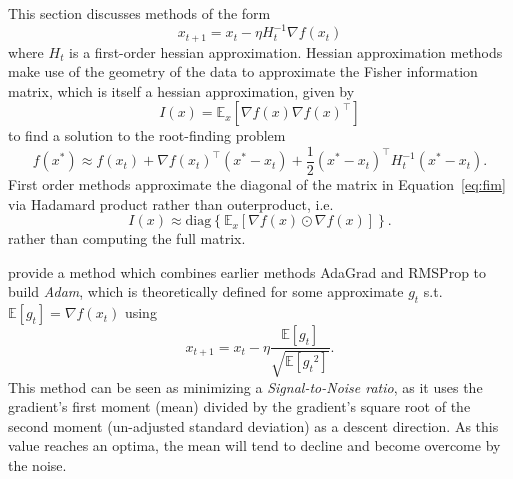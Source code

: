 \documentclass{article}
\newcommand{\E}{\mathbb E}
\theoremstyle{definition}
\begin{document}
This section discusses methods of the form 
\begin{equation}
    x_{t + 1} = x_t - \eta H_t^{-1} \nabla f(x_t)
\end{equation}
where $H_t$ is a first-order hessian approximation.  Hessian approximation
methods make use of the geometry of the data to approximate the Fisher
information matrix, which is itself a hessian approximation, given by 
\begin{equation}
    \label{eq:fim}
    I(x) = \mathbb E_x \left[ \nabla f(x) \nabla {f(x)}^\intercal \right]
\end{equation}
to find a solution to the root-finding problem
\begin{equation}
    f(x^*) \approx f(x_t) + \nabla {f(x_t)}^\intercal (x^* - x_t) + \frac 1 2 {(x^* -
    x_t)}^\intercal H_t^{-1} (x^* - x_t).
\end{equation}
First order methods approximate the diagonal of the matrix in
Equation~\ref{eq:fim} via Hadamard product rather than outerproduct, i.e. 
\begin{equation}
    I(x) \approx \text{diag} \left\{ \mathbb E_x \left[ \nabla f(x) \odot \nabla
    {f(x)} \right] \right\}.
\end{equation}
rather than computing the full matrix.

\citeauthor{DBLP:journals/corr/KingmaB14} provide a method which combines
earlier methods AdaGrad and RMSProp to build \emph{Adam}, which is theoretically
defined for some approximate $g_t$ s.t. $\E [g_t] = \nabla f(x_t)$ using
\begin{equation}
    x_{t + 1} = x_t - \eta \frac{\E \left[ g_t \right]}{\sqrt{\E \left[
        {g_t}^2  \right] }}.
\end{equation}
This method can be seen as minimizing a \emph{Signal-to-Noise ratio}, as it
uses the gradient's first moment (mean) divided by the gradient's square root of
the second moment (un-adjusted standard deviation) as a descent direction. As
this value reaches an optima, the mean will tend to decline and become overcome
by the noise.
\end{document}
